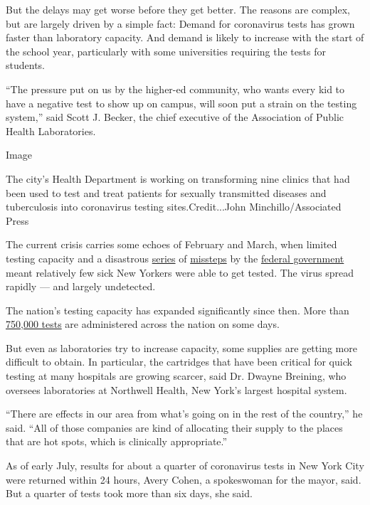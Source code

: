 But the delays may get worse before they get better. The reasons are
complex, but are largely driven by a simple fact: Demand for coronavirus
tests has grown faster than laboratory capacity. And demand is likely to
increase with the start of the school year, particularly with some
universities requiring the tests for students.

``The pressure put on us by the higher-ed community, who wants every kid
to have a negative test to show up on campus, will soon put a strain on
the testing system,'' said Scott J. Becker, the chief executive of the
Association of Public Health Laboratories.

Image

The city's Health Department is working on transforming nine clinics
that had been used to test and treat patients for sexually transmitted
diseases and tuberculosis into coronavirus testing sites.Credit...John
Minchillo/Associated Press

The current crisis carries some echoes of February and March, when
limited testing capacity and a disastrous
\href{https://www.nytimes3xbfgragh.onion/2020/04/18/health/cdc-coronavirus-lab-contamination-testing.html}{series}
of
\href{https://www.nytimes3xbfgragh.onion/2020/03/28/us/testing-coronavirus-pandemic.html}{missteps}
by the
\href{https://www.nytimes3xbfgragh.onion/2020/06/03/us/cdc-coronavirus.html}{federal
government} meant relatively few sick New Yorkers were able to get
tested. The virus spread rapidly --- and largely undetected.

The nation's testing capacity has expanded significantly since then.
More than
\href{https://coronavirus.jhu.edu/testing/individual-states/usa}{750,000
tests} are administered across the nation on some days.

But even as laboratories try to increase capacity, some supplies are
getting more difficult to obtain. In particular, the cartridges that
have been critical for quick testing at many hospitals are growing
scarcer, said Dr. Dwayne Breining, who oversees laboratories at
Northwell Health, New York's largest hospital system.

``There are effects in our area from what's going on in the rest of the
country,'' he said. ``All of those companies are kind of allocating
their supply to the places that are hot spots, which is clinically
appropriate.''

As of early July, results for about a quarter of coronavirus tests in
New York City were returned within 24 hours, Avery Cohen, a spokeswoman
for the mayor, said. But a quarter of tests took more than six days, she
said.

